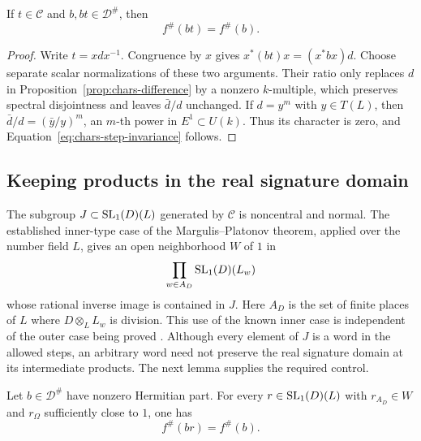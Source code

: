 \begin{corollary}\label{cor:chars-step-invariance}
If $t\in\mathcal C$ and $b,bt\in\mathcal D^\#$, then
\begin{equation}\label{eq:chars-step-invariance}
 f^\#(bt)=f^\#(b).
\end{equation}
\end{corollary}

\begin{proof}
Write $t=xdx^{-1}$. Congruence by $x$ gives
$x^*(bt)x=(x^*bx)d$. Choose separate scalar normalizations of these
two arguments. Their ratio only replaces $d$ in
Proposition~\ref{prop:chars-difference} by a nonzero $k$-multiple, which
preserves spectral disjointness and leaves $\bar d/d$ unchanged.
If $d=y^m$ with $y\in T(L)$, then
$\bar d/d=(\bar y/y)^m$, an $m$-th power in $E^1\subset U(k)$.
Thus its character is zero, and
Equation~\ref{eq:chars-step-invariance} follows.
\end{proof}

\subsection{Keeping products in the real signature domain}

The subgroup $J\subset\operatorname{SL}_1(D)(L)$ generated by $\mathcal C$ is
noncentral and normal. The established inner-type case of the
Margulis--Platonov theorem, applied over the number field $L$, gives an
open neighborhood $W$ of $1$ in
\[
 \prod_{w\in A_D}\operatorname{SL}_1(D)(L_w)
\]
whose rational inverse image is contained in $J$. Here $A_D$ is the set
of finite places of $L$ where $D\otimes_LL_w$ is division. This use of
the known inner case is independent of the outer case being proved
\cite[Theorem~2]{SegevSeitz2002}\cite[Sections~3.4--3.5]{PRsurvey}.
Although every element of $J$ is a word in the allowed steps, an
arbitrary word need not preserve the real signature domain at its
intermediate products. The next lemma supplies the required control.

\begin{lemma}\label{lem:chars-local-invariance}
Let $b\in\mathcal D^\#$ have nonzero Hermitian part. For every
$r\in\operatorname{SL}_1(D)(L)$ with $r_{A_D}\in W$ and $r_\Omega$ sufficiently
close to $1$, one has
\begin{equation}\label{eq:chars-local-invariance}
 f^\#(br)=f^\#(b).
\end{equation}
\end{lemma}

